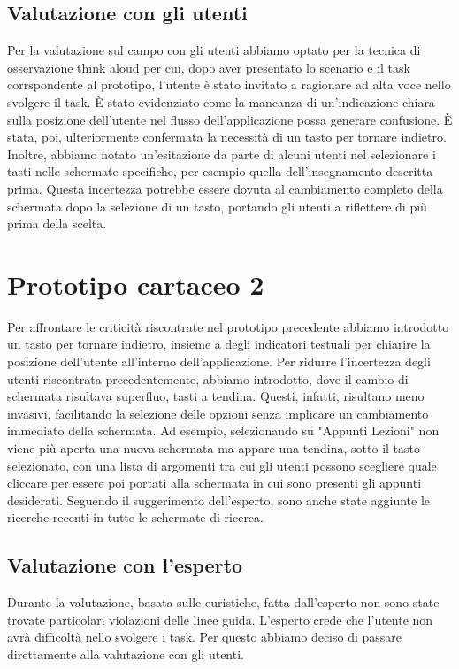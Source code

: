\subsection{Valutazione con gli utenti}
Per la valutazione sul campo con gli utenti abbiamo optato per la tecnica di osservazione think aloud per cui, dopo aver presentato lo scenario
e il task corrspondente al prototipo, l'utente è stato invitato a ragionare ad alta voce nello svolgere il task. È stato evidenziato come la mancanza
di un'indicazione chiara sulla posizione dell'utente nel flusso dell'applicazione possa generare confusione. È stata, poi, ulteriormente confermata la necessità di
un tasto per tornare indietro.
Inoltre, abbiamo notato un'esitazione da parte di alcuni utenti nel selezionare i tasti nelle schermate specifiche, per esempio quella dell'insegnamento descritta
prima. Questa incertezza potrebbe essere dovuta al cambiamento completo della schermata dopo la selezione di un tasto, portando gli utenti a riflettere di più prima della scelta.


\section{Prototipo cartaceo 2}
Per affrontare le criticità riscontrate nel prototipo precedente abbiamo introdotto un tasto per tornare indietro, insieme a degli indicatori testuali per chiarire
la posizione dell'utente all'interno dell'applicazione.
Per ridurre l'incertezza degli utenti riscontrata precedentemente, abbiamo introdotto, dove il cambio di schermata risultava superfluo, tasti a tendina. Questi,
infatti, risultano meno invasivi, facilitando la selezione delle opzioni senza implicare un cambiamento immediato della schermata. Ad esempio, selezionando su
"Appunti Lezioni" non viene più aperta una nuova schermata ma appare una tendina, sotto il tasto selezionato, con una lista di argomenti tra cui gli utenti possono
scegliere quale cliccare per essere poi portati alla schermata in cui sono presenti gli appunti desiderati.
Seguendo il suggerimento dell'esperto, sono anche state aggiunte le ricerche recenti in tutte le schermate di ricerca.


\subsection{Valutazione con l'esperto}
Durante la valutazione, basata sulle euristiche, fatta dall’esperto non sono state trovate particolari violazioni delle linee guida. L’esperto crede che l’utente non avrà difficoltà nello svolgere i task.
Per questo abbiamo deciso di passare direttamente alla valutazione con gli utenti.


